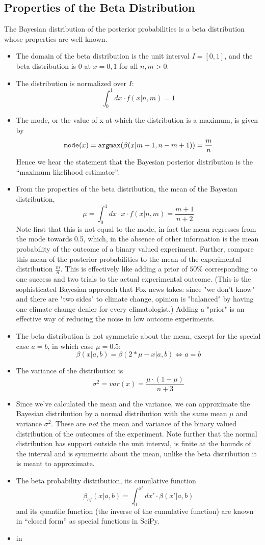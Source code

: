 \documentclass[12pt]{report}
\newcommand{\bdm}{\begin{displaymath}} %
\newcommand{\edm}{\end{displaymath}} %
\newcommand{\bi}{\begin{itemize}} %
\newcommand{\ei}{\end{itemize}} %
\begin{document}
\subsection{Properties of the Beta Distribution}
The Bayesian distribution of the posterior probabilities is a beta
distribution whose properties are well known.
\bi
\item The domain of the beta distribution is the unit interval  \(I =
  [0,1]\), and the beta distribution is 0 at \(x=0,1\)  for all \(n,m
  >0\).
\item The distribution is normalized over \(I\):
  \bdm
  \int_0^1 dx\cdot f(x|n,m) = 1
  \edm
\item The mode, or the value of x at which the distribution is a
  maximum, is given by
  \bdm
  {\tt mode}(x) = {\tt argmax}(\beta(x|m+1, n-m+1)) = \frac{m}{n}
  \edm
  Hence we hear the statement that the Bayesian posterior
  distribution is the ``maximum likelihood estimator''.
\item From the properties of the beta distribution,
the mean of the Bayesian distribution,
  \bdm \mu = \int_0^1 dx \cdot x\cdot f(x|n,m) = \frac{m+1}{n+2}
  \edm
  Note first that this is not
  equal to the mode, in fact the mean regresses from the mode towards
  0.5, which, in
  the absence of other information is the mean probability of the
  outcome of a binary valued experiment.
  Further, compare this mean of the posterior probabilities to the
  mean of the experimental distribution \(\frac{m}{n}\). This is
  effectively like adding a prior of \(50\%\) corresponding to
  one success and two trials to the actual experimental outcome.
  (This is the sophisticated Bayesian approach that Fox news
  takes: since "we don't know" and there are "two sides" to climate
  change, opinion is "balanced" by having one climate change denier
  for every climatologist.) Adding a "prior" is an
  effective way of reducing the noise in low outcome experiments. 
\item The beta distribution is not symmetric about the mean,
  except for the special case \(a=b\), in which case \(\mu = 0.5\):
  \bdm
  \beta(x|a,b) = \beta(2*\mu-x|a,b) \iff a=b
  \edm
\item The variance of the distribution is 
  \bdm
  \sigma^2 = var(x) = \frac{\mu\cdot(1-\mu)}{n+3}
  \edm
\item Since we've calculated the mean and the variance, we can
  approximate the Bayesian distribution by a normal distribution with
  the same mean \(\mu\) and variance \(\sigma^2\). These are
  {\it not} the mean and variance of the binary valued distribution of
  the outcomes of the experiment. Note further that the normal
  distribution has support
  outside the unit interval, is finite at the bounds of the interval
  and is symmetric about the mean, unlike the beta distribution it is
  meant to approximate.
\item The beta probability distribution, its
cumulative function 
  \bdm
  \beta_{cf}(x|a,b) = \int_0^{x'}dx'\cdot\beta(x'|a,b)
  \edm
  and its quantile function (the inverse of the cumulative function)
  are known in ``closed form'' as special functions in SciPy.
  \item in 
\ei
\end{document}
